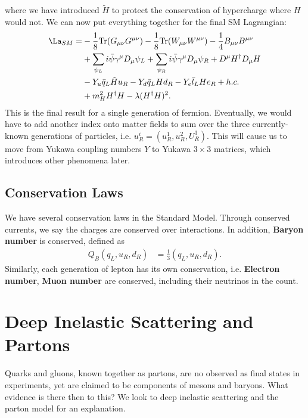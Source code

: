 \documentclass[a4paper, 11pt, normalem]{report}
\begin{document}
where we have introduced $\tilde{H}$ to protect the conservation of hypercharge where $H$ would not.
We can now put everything together for the final SM Lagrangian:
\begin{align}
    \begin{split}
        \La_{SM} = &-\frac18\text{Tr}(G_{\mu\nu}G^{\mu\nu}) - \frac18\text{Tr}(W_{\mu\nu}W^{\mu\nu}) - \frac14B_{\mu\nu}B^{\mu\nu} \\
                   &+ \sum_{\psi_L}i\bar{\psi}\gamma^\mu D_\mu\psi_L + \sum_{\psi_R} i\bar{\psi}\gamma^\mu D_\mu \psi_R + D^\mu H^\dagger D_\mu H \\
                   &- Y_u\bar{q}_L\tilde{H}u_R - Y_d\bar{q}_LHd_R - Y_e\bar{l}_LHe_R + h.c. \\
                   &+ m_H^2 H^\dagger H - \lambda(H^\dagger H)^2.
    \end{split}
\end{align}
This is the final result for a single generation of fermion.
Eventually, we would have to add another index onto matter fields to sum over the three currently-known generations of particles, i.e. $u_R^i = (u_R^1,u_R^2,U_R^3)$.
This will cause us to move from Yukawa coupling numbers $Y$ to Yukawa $3\times3$ matrices, which introduces other phenomena later.

\section{Conservation Laws}
We have several conservation laws in the Standard Model.
Through conserved currents, we say the charges are conserved over interactions.
In addition, \textbf{Baryon number} is conserved, defined as
\begin{align}
    Q_B(q_L,u_R,d_R) &= \frac13(q_L,u_R,d_R).
\end{align}
Similarly, each generation of lepton has its own conservation, i.e. \textbf{Electron number}, \textbf{Muon number} are conserved, including their neutrinos in the count.

\chapter{Deep Inelastic Scattering and Partons}
Quarks and gluons, known together as partons, are no observed as final states in experiments, yet are claimed to be components of mesons and baryons.
What evidence is there then to this?
We look to deep inelastic scattering and the parton model for an explanation.
\end{document}
